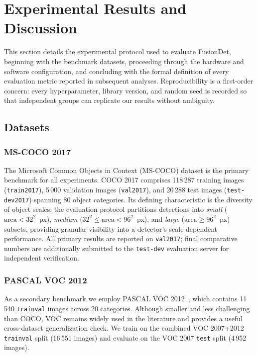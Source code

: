 
\section{Experimental Results and Discussion}
\label{sec:results}

This section details the experimental protocol used to evaluate
FusionDet, beginning with the benchmark datasets, proceeding
through the hardware and software configuration, and concluding
with the formal definition of every evaluation metric reported
in subsequent analyses.  Reproducibility is a first-order
concern: every hyperparameter, library version, and random seed
is recorded so that independent groups can replicate our
results without ambiguity.

\subsection{Datasets}

\subsubsection{MS-COCO 2017}

The Microsoft Common Objects in Context (MS-COCO)
\cite{lin2014microsoft} dataset is the primary benchmark for
all experiments.  COCO 2017 comprises 118\,287 training images
(\texttt{train2017}), 5\,000 validation images
(\texttt{val2017}), and 20\,288 test images
(\texttt{test-dev2017}) spanning 80 object categories.  Its
defining characteristic is the diversity of object scales: the
evaluation protocol partitions detections into \textit{small}
($\text{area} < 32^{2}$~px), \textit{medium}
($32^{2} \leq \text{area} < 96^{2}$~px), and \textit{large}
($\text{area} \geq 96^{2}$~px) subsets, providing granular
visibility into a detector's scale-dependent performance.
All primary results are reported on \texttt{val2017}; final
comparative numbers are additionally submitted to the
\texttt{test-dev} evaluation server for independent
verification.

\subsubsection{PASCAL VOC 2012}

As a secondary benchmark we employ PASCAL VOC
2012~\cite{everingham2010pascal}, which contains 11\,540
\texttt{trainval} images across 20 categories.  Although
smaller and less challenging than COCO, VOC remains widely used
in the literature and provides a useful cross-dataset
generalization check.  We train on the combined VOC 2007+2012
\texttt{trainval} split (16\,551 images) and evaluate on the
VOC 2007 \texttt{test} split (4\,952 images).

